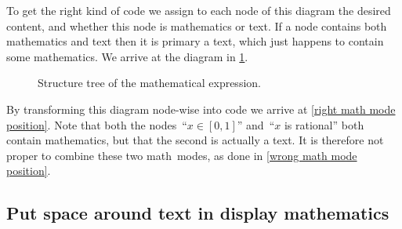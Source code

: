 To get the right kind of code we assign to each node of this diagram the desired content, and whether this node is mathematics or text.
If a node contains both mathematics and text then it is primary a text, which just happens to contain some mathematics.
We arrive at the diagram in \cref{structure tree of math}.
\begin{figure}[tb]
  \begin{center}
  \end{center}
  \caption{Structure tree of the mathematical expression.}
  \label{structure tree of math}
\end{figure}
By transforming this diagram node-wise into code we arrive at \cref{right math mode position}.
Note that both the nodes~\enquote{$x \in [0,1]$} and~\enquote{$x$ is rational} both contain mathematics, but that the second is actually a text.
It is therefore not proper to combine these two math~modes, as done in \cref{wrong math mode position}.



\subsection{Put space around text in display mathematics}


